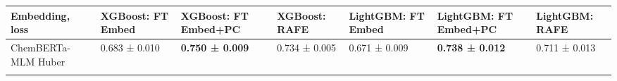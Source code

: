 \documentclass[
  10pt,
]{article}
\begin{document}
\begin{longtable}[]{@{}lllllll@{}}
\toprule
\begin{minipage}[b]{0.12\columnwidth}\raggedright
Embedding, loss\strut
\end{minipage} & \begin{minipage}[b]{0.12\columnwidth}\raggedright
XGBoost: FT Embed\strut
\end{minipage} & \begin{minipage}[b]{0.12\columnwidth}\raggedright
XGBoost: FT Embed+PC\strut
\end{minipage} & \begin{minipage}[b]{0.12\columnwidth}\raggedright
XGBoost: RAFE\strut
\end{minipage} & \begin{minipage}[b]{0.12\columnwidth}\raggedright
LightGBM: FT Embed\strut
\end{minipage} & \begin{minipage}[b]{0.12\columnwidth}\raggedright
LightGBM: FT Embed+PC\strut
\end{minipage} & \begin{minipage}[b]{0.12\columnwidth}\raggedright
LightGBM: RAFE\strut
\end{minipage}\tabularnewline
\midrule
\endhead
\begin{minipage}[t]{0.12\columnwidth}\raggedright
ChemBERTa-MLM Huber\strut
\end{minipage} & \begin{minipage}[t]{0.12\columnwidth}\raggedright
0.683 ± 0.010\strut
\end{minipage} & \begin{minipage}[t]{0.12\columnwidth}\raggedright
\textbf{0.750 ± 0.009}\strut
\end{minipage} & \begin{minipage}[t]{0.12\columnwidth}\raggedright
0.734 ± 0.005\strut
\end{minipage} & \begin{minipage}[t]{0.12\columnwidth}\raggedright
0.671 ± 0.009\strut
\end{minipage} & \begin{minipage}[t]{0.12\columnwidth}\raggedright
\textbf{0.738 ± 0.012}\strut
\end{minipage} & \begin{minipage}[t]{0.12\columnwidth}\raggedright
0.711 ± 0.013\strut
\end{minipage}\tabularnewline
\begin{minipage}[t]{0.12\columnwidth}\raggedright

\end{minipage}
\end{longtable}
\end{document}
